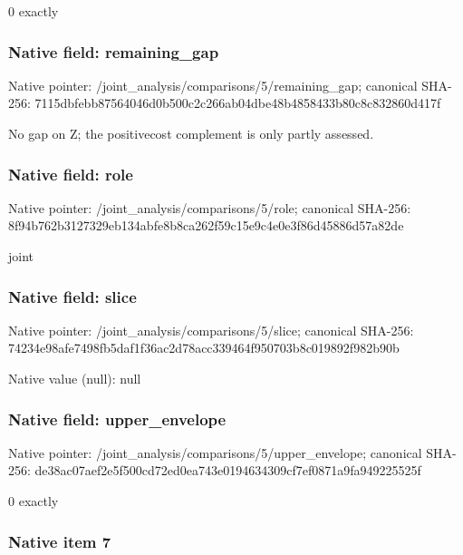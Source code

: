 \documentclass[10pt,a4paper]{article}
\begin{document}
0 exactly


\subsubsection{Native field: remaining\_gap}


Native pointer: /joint\_analysis/comparis\allowbreak{}ons/5/remaining\_gap; canonical SHA-256: 7115dbfebb87564046d0b500\allowbreak{}c2c266ab04dbe48b4858433b\allowbreak{}80c8c832860d417f


No gap on Z; the positivecost complement is only partly assessed.


\subsubsection{Native field: role}


Native pointer: /joint\_analysis/comparisons/5/role; canonical SHA-256: 8f94b762b3127329eb134abf\allowbreak{}e8b8ca262f59c15e9c4e0e3f\allowbreak{}86d45886d57a82de


joint


\subsubsection{Native field: slice}


Native pointer: /joint\_analysis/comparisons/5/slice; canonical SHA-256: 74234e98afe7498fb5daf1f3\allowbreak{}6ac2d78acc339464f950703b\allowbreak{}8c019892f982b90b



Native value (null): null



\subsubsection{Native field: upper\_envelope}


Native pointer: /joint\_analysis/comparis\allowbreak{}ons/5/upper\_envelope; canonical SHA-256: de38ac07aef2e5f500cd72ed\allowbreak{}0ea743e0194634309cf7ef08\allowbreak{}71a9fa949225525f


0 exactly


\subsubsection{Native item 7}
\end{document}
